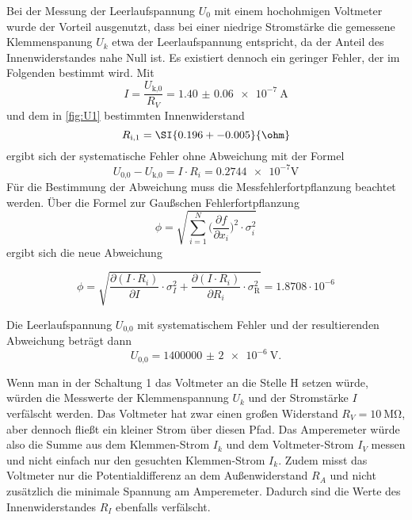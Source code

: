   Bei der Messung der Leerlaufspannung $U_0$ mit einem hochohmigen Voltmeter
  wurde der Vorteil ausgenutzt, dass bei einer niedrige Stromstärke die
  gemessene Klemmenspanung $U_k$ etwa der Leerlaufspannung entspricht, da
  der Anteil des Innenwiderstandes nahe Null ist.
  Es existiert dennoch ein geringer Fehler, der im Folgenden bestimmt wird.
  Mit
  \begin{equation}
    I = \frac{U_\text{k,0}}{R_V} = \SI{1.40(6)e-7}{\A}
  \end{equation}
  und dem in \ref{fig:U1} bestimmten Innenwiderstand
  \begin{equation}
    R_\text{i,1} = \SI{0.196 +- 0.005}{\ohm}
  \end{equation}
  ergibt sich der systematische Fehler ohne Abweichung mit der Formel
  \begin{equation}
    U_\text{0,0} - U_\text{k,0} = I \cdot R_i = \num{0.2744e-7} \si{\V}
  \end{equation}
  Für die Bestimmung der Abweichung muss die Messfehlerfortpflanzung
  beachtet werden. Über die Formel zur Gaußschen Fehlerfortpflanzung
  \begin{equation}
    \phi = \sqrt{\sum_{i=1}^{N} \biggl(\frac{\partial f}{\partial x_i}\biggr)^2
    \cdot \sigma_i^2}
  \end{equation}
  ergibt sich die neue Abweichung

  \begin{equation}
    \phi = \sqrt{\frac{\partial(I \cdot R_i)}{\partial I} \cdot \sigma_I^2
    + \frac{\partial(I \cdot R_i)}{\partial R_i} \cdot \sigma_\text{R}^2}
    = 1.8708 \cdot 10^{-6}
  \end{equation}

  Die Leerlaufspannung $U_\text{0,0}$ mit systematischem Fehler und der
  resultierenden Abweichung beträgt dann
  \begin{equation}
    U_\text{0,0} = \SI{1400000(2)e-6}{\V}.
  \end{equation}

  Wenn man in der Schaltung 1 das Voltmeter an die Stelle H
  setzen würde, würden die Messwerte der Klemmenspannung $U_k$ und der
  Stromstärke $I$ verfälscht werden. Das Voltmeter hat zwar einen großen
  Widerstand $R_V = \SI{10}{\mega\ohm}$, aber dennoch fließt ein kleiner Strom
  über diesen Pfad. Das Amperemeter würde also die Summe aus dem
  Klemmen-Strom $I_k$ und dem Voltmeter-Strom $I_V$ messen und nicht einfach
  nur den gesuchten Klemmen-Strom $I_k$.
  Zudem misst das Voltmeter nur die Potentialdifferenz an dem Außenwiderstand
  $R_A$ und nicht zusätzlich die minimale Spannung am Amperemeter. Dadurch
  sind die Werte des Innenwiderstandes $R_I$ ebenfalls verfälscht.
